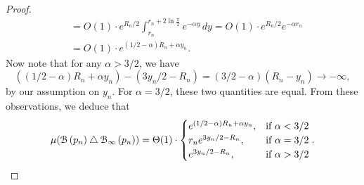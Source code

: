 \begin{proof}
\begin{align*}
	&= O(1) \cdot e^{R_n/2} \int_{r_n}^{r_n + 2 \ln \frac{\pi}{2}} e^{-\alpha y} \, dy 
		= O(1) \cdot e^{R_n/2} e^{-\alpha r_n} \\
	&=O(1) \cdot e^{(1/2 - \alpha) R_n + \alpha y_n}.
\end{align*}
Now note that for any $\alpha > 3/2$, we have 
\[
	\left( (1/2 - \alpha) R_n + \alpha y_n\right) - \left(3y_n/2 - R_n \right)
	= (3/2 -\alpha) (R_n- y_n) \to -\infty,
\]
by our assumption on $y_n$. For $\alpha = 3/2$, these two quantities are equal. From these observations, we deduce that 
\[
	\mu ({\mathcal B}\left(p_n\right) \bigtriangleup {\mathcal B}_{\infty}\left(p_n\right) ) 
	= \Theta (1) \cdot \begin{cases} 
		e^{(1/2-\alpha)R_n + \alpha y_n}, & \mbox{if } \alpha < 3/2 \\
		r_n e^{3y_n/2 - R_n}, & \mbox{if }\alpha = 3/2\\
		e^{3y_n/2 - R_n}, &  \mbox{if } \alpha > 3/2 
	\end{cases}.
\]
\end{proof}


